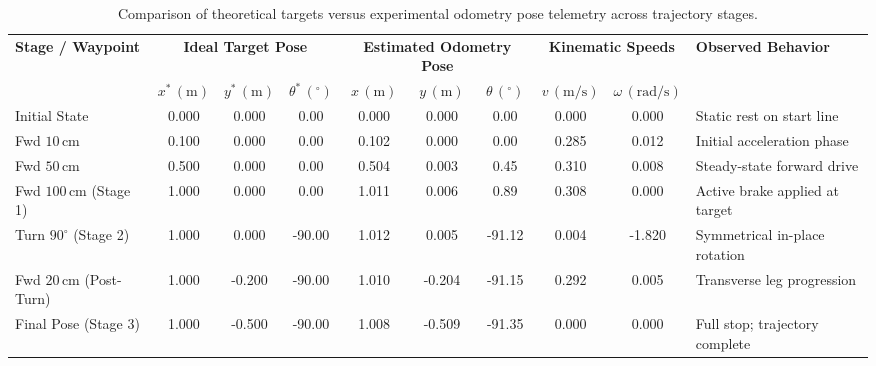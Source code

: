 \documentclass[11pt,a4paper]{article}
\begin{document}
\begin{table}[H]
\centering
\scriptsize
\setlength{\tabcolsep}{3.0pt}
\renewcommand{\arraystretch}{0.88}
\begin{tabularx}{\textwidth}{@{}l ccc ccc cc X@{}}
\toprule
\textbf{Stage / Waypoint} & \multicolumn{3}{c}{\textbf{Ideal Target Pose}} & \multicolumn{3}{c}{\textbf{Estimated Odometry Pose}} & \multicolumn{2}{c}{\textbf{Kinematic Speeds}} & \textbf{Observed Behavior} \\
\cmidrule(lr){2-4} \cmidrule(lr){5-7} \cmidrule(lr){8-9}
& $x^*\,(\text{m})$ & $y^*\,(\text{m})$ & $\theta^*\,(^\circ)$ & $x\,(\text{m})$ & $y\,(\text{m})$ & $\theta\,(^\circ)$ & $v\,(\text{m/s})$ & $\omega\,(\text{rad/s})$ & \\
\midrule
Initial State & 0.000 & 0.000 & 0.00 & 0.000 & 0.000 & 0.00 & 0.000 & 0.000 & Static rest on start line \\
Fwd $10\,\text{cm}$ & 0.100 & 0.000 & 0.00 & 0.102 & 0.000 & 0.00 & 0.285 & 0.012 & Initial acceleration phase \\
Fwd $50\,\text{cm}$ & 0.500 & 0.000 & 0.00 & 0.504 & 0.003 & 0.45 & 0.310 & 0.008 & Steady-state forward drive \\
Fwd $100\,\text{cm}$ (Stage 1) & 1.000 & 0.000 & 0.00 & 1.011 & 0.006 & 0.89 & 0.308 & 0.000 & Active brake applied at target \\
Turn $90^\circ$ (Stage 2) & 1.000 & 0.000 & -90.00 & 1.012 & 0.005 & -91.12 & 0.004 & -1.820 & Symmetrical in-place rotation \\
Fwd $20\,\text{cm}$ (Post-Turn) & 1.000 & -0.200 & -90.00 & 1.010 & -0.204 & -91.15 & 0.292 & 0.005 & Transverse leg progression \\
Final Pose (Stage 3) & 1.000 & -0.500 & -90.00 & 1.008 & -0.509 & -91.35 & 0.000 & 0.000 & Full stop; trajectory complete \\
\bottomrule
\end{tabularx}
\caption{Comparison of theoretical targets versus experimental odometry pose telemetry across trajectory stages.}
\label{tab_results}
\end{table}
\end{document}
